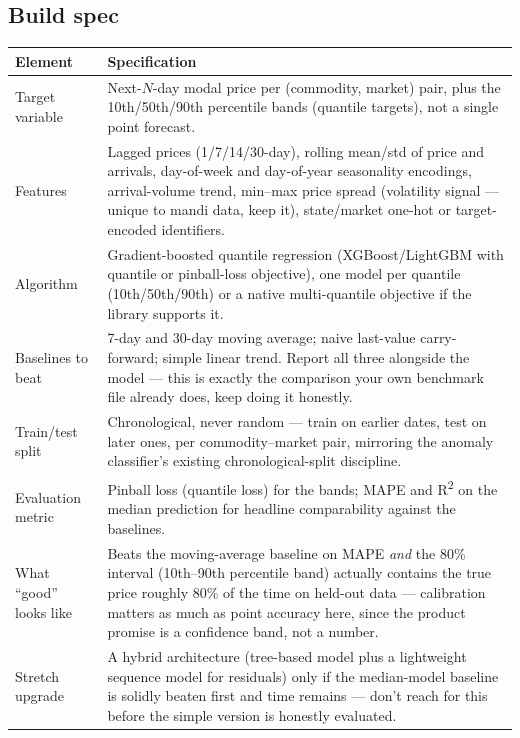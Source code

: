 \documentclass[11pt]{article}
\begin{document}
\subsection*{Build spec}
\renewcommand{\arraystretch}{1.3}
\noindent\begin{longtable}{@{}p{3.0cm}p{9.5cm}@{}}
\toprule
\textbf{Element} & \textbf{Specification} \\
\midrule
\endhead
Target variable & Next-$N$-day modal price per (commodity, market) pair, plus the 10th/50th/90th percentile
bands (quantile targets), not a single point forecast. \\[0.3em]
Features & Lagged prices (1/7/14/30-day), rolling mean/std of price and arrivals, day-of-week and
day-of-year seasonality encodings, arrival-volume trend, min--max price spread (volatility signal ---
unique to mandi data, keep it), state/market one-hot or target-encoded identifiers. \\[0.3em]
Algorithm & Gradient-boosted quantile regression (XGBoost/LightGBM with quantile or pinball-loss
objective), one model per quantile (10th/50th/90th) or a native multi-quantile objective if the library
supports it. \\[0.3em]
Baselines to beat & 7-day and 30-day moving average; naive last-value carry-forward; simple linear trend.
Report all three alongside the model --- this is exactly the comparison your own benchmark file already
does, keep doing it honestly. \\[0.3em]
Train/test split & Chronological, never random --- train on earlier dates, test on later ones, per
commodity--market pair, mirroring the anomaly classifier's existing chronological-split discipline. \\[0.3em]
Evaluation metric & Pinball loss (quantile loss) for the bands; MAPE and R\textsuperscript{2} on the median
prediction for headline comparability against the baselines. \\[0.3em]
What ``good'' looks like & Beats the moving-average baseline on MAPE \emph{and} the 80\% interval (10th--90th
percentile band) actually contains the true price roughly 80\% of the time on held-out data --- calibration
matters as much as point accuracy here, since the product promise is a confidence band, not a number. \\[0.3em]
Stretch upgrade & A hybrid architecture (tree-based model plus a lightweight sequence model for residuals)
only if the median-model baseline is solidly beaten first and time remains --- don't reach for this before
the simple version is honestly evaluated. \\
\bottomrule
\end{longtable}
\end{document}
